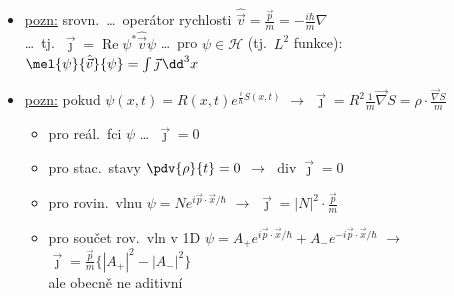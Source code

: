 \begin{itemize}
  \item \underline{pozn:} srovn.\ \dots\ operátor rychlosti \quad $\hat{\vec v} = \frac{\vec p}{m} = -\frac{i\hbar}{m}\nabla$ \\
        \dots\ tj.\ $\vec\jmath = \operatorname{Re}\psi^*\hat{\vec v}\psi$ \quad \dots\ pro $\psi\in\mathcal{H}$ (tj.\ $L^2$ funkce): \quad
        $\mel{\psi}{\hat{\vec v}}{\psi} = \int\vec\jmath\,\dd^3x$
  \item \underline{pozn:} pokud $\psi(x,t) = R(x,t)e^{\frac{i}{\hbar}S(x,t)}$ \quad $\to$ \quad
        $\vec\jmath = R^2\frac1m\vec\nabla S = \rho\cdot\frac{\vec\nabla S}{m}$
  \begin{itemize}[nosep]
    \item[--] pro reál.\ fci $\psi$ \dots\ $\vec\jmath = 0$
    \item[--] pro stac.\ stavy $\pdv{\rho}{t} = 0$ $\to$ $\operatorname{div}\vec\jmath = 0$
    \item[--] pro rovin.\ vlnu \quad $\psi = Ne^{i\vec p\cdot\vec x/\hbar}$ $\to$ $\vec\jmath = |N|^2\cdot\frac{\vec p}{m}$
    \item[--] pro součet rov.\ vln v 1D \quad $\psi = A_+e^{i\vec p\cdot\vec x/\hbar} + A_-e^{-i\vec p\cdot\vec x/\hbar}$ $\to$
          $\vec\jmath = \frac{\vec p}{m}\big\{|A_+|^2 - |A_-|^2\big\}$ \\
          ale obecně ne aditivní
  \end{itemize}
\end{itemize}

